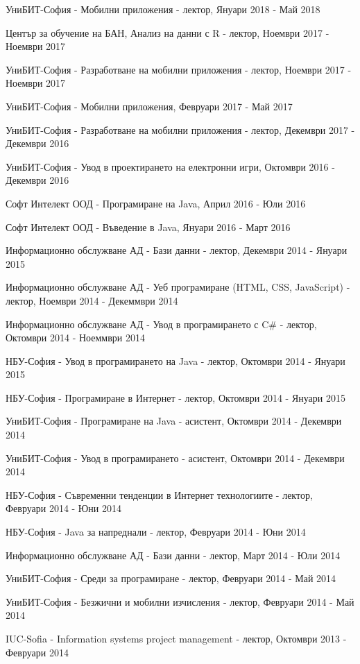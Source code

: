 \documentclass[bulgarian,a4paper]{europasscv}
\begin{document}
\begin{europasscv}
{\begin{ecvitemize}
    \item УниБИТ-София - Мобилни приложения - лектор, Януари 2018 - Май 2018
    \item Център за обучение на БАН, Анализ на данни с R - лектор, Ноември 2017 - Ноември 2017
    \item УниБИТ-София - Разработване на мобилни приложения - лектор, Ноември 2017 - Ноември 2017
    \item УниБИТ-София - Мобилни приложения, Февруари 2017 - Май 2017
    \item УниБИТ-София - Разработване на мобилни приложения - лектор, Декември 2017 - Декември 2016
    \item УниБИТ-София - Увод в проектирането на електронни игри, Октомври 2016 - Декември 2016
    \item Софт Интелект ООД  - Програмиране на Java, Април 2016 - Юли 2016
    \item Софт Интелект ООД  - Въведение в Java, Януари 2016 - Март 2016
    \item Информационно обслужване АД - Бази данни - лектор, Декември 2014 - Януари 2015
    \item Информационно обслужване АД - Уеб програмиране (HTML, CSS, JavaScript) - лектор, Ноември 2014 - Декеммври 2014
    \item Информационно обслужване АД - Увод в програмирането с C\# - лектор, Октомври 2014 - Ноеммври 2014
    \item НБУ-София - Увод в програмирането на Java - лектор, Октомври 2014 - Януари 2015
    \item НБУ-София - Програмиране в Интернет - лектор, Октомври 2014 - Януари 2015
    \item УниБИТ-София - Програмиране на Java - асистент, Октомври 2014 - Декември 2014
    \item УниБИТ-София - Увод в програмирането - асистент, Октомври 2014 - Декември 2014
    \item НБУ-София - Съвременни тенденции в Интернет технологиите - лектор, Февруари 2014 - Юни 2014
    \item НБУ-София - Java за напреднали - лектор, Февруари 2014 - Юни 2014
    \item Информационно обслужване АД - Бази данни - лектор, Март 2014 - Юли 2014
    \item УниБИТ-София - Среди за програмиране - лектор, Февруари 2014 - Май 2014
    \item УниБИТ-София - Безжични и мобилни изчисления - лектор, Февруари 2014 - Май 2014
    \item IUC-Sofia - Information systems project management - лектор, Октомври 2013 - Февруари 2014

\end{ecvitemize}}
\end{europasscv}
\end{document}
